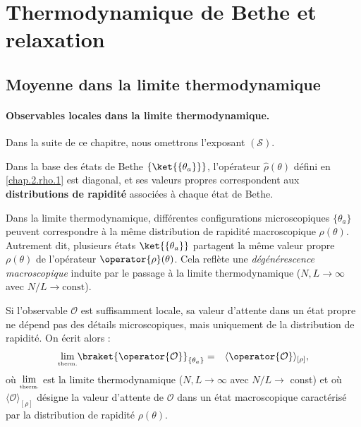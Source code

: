 %

\section{Thermodynamique de Bethe et relaxation}

\subsection{Moyenne dans la limite thermodynamique}

\paragraph{Observables locales dans la limite thermodynamique.}
Dans la suite de ce chapitre, nous omettrons l’exposant $(\mathcal{S})$.
\vspace{0.2em}

\medskip

Dans la base des états de Bethe \( \{ \ket{\{ \theta_a \}} \} \), l’opérateur \( \hat{\rho}(\theta) \) défini en \eqref{chap.2.rho.1} est diagonal, et ses valeurs propres correspondent aux {\bf distributions de rapidité} associées à chaque état de Bethe.

\vspace{0.5em}
\medskip

Dans la limite thermodynamique, différentes configurations microscopiques \( \{ \theta_a \} \) peuvent correspondre à la même distribution de rapidité macroscopique \( \rho(\theta) \). Autrement dit, plusieurs états \( \ket{\{ \theta_a \}} \) partagent la même valeur propre \( \rho(\theta) \) de l’opérateur \( \operator{\rho}(\theta) \). Cela reflète une {\em dégénérescence macroscopique} induite par le passage à la limite thermodynamique (\( N, L \to \infty \) avec \( N/L \to \text{const} \)).

\vspace{0.5em}
\medskip

Si l’observable $\mathcal{O}$ est suffisamment locale, sa valeur d’attente dans un état propre ne dépend pas des détails microscopiques, mais uniquement de la distribution de rapidité. On écrit alors :
\begin{eqnarray}
	\underset{\mbox{\tiny therm.}}{\lim} \braket{  \operator{\mathcal{O}} }_{\{ \theta_a\}}  & = & \langle \operator{\mathcal{O}}\rangle_{[\rho]},
\end{eqnarray}
où $\underset{\mbox{\tiny therm.}}{\lim}$ est la limite thermodynamique ($N,L \to \infty$ avec $N/L \to $ const) et où \( \langle \mathcal{O} \rangle_{[\rho]} \) désigne la valeur d’attente de \( \mathcal{O} \) dans un état macroscopique caractérisé par la distribution de rapidité \( \rho(\theta) \).


